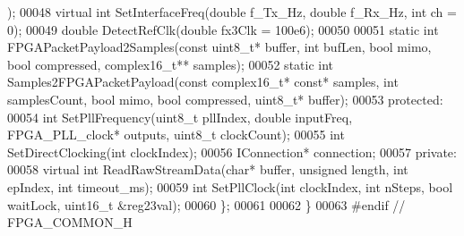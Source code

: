 \begin{DoxyCode}
      );
00048     \textcolor{keyword}{virtual} \textcolor{keywordtype}{int} SetInterfaceFreq(\textcolor{keywordtype}{double} f\_Tx\_Hz, \textcolor{keywordtype}{double} f\_Rx\_Hz, \textcolor{keywordtype}{int} ch = 0);
00049     \textcolor{keywordtype}{double} DetectRefClk(\textcolor{keywordtype}{double} fx3Clk = 100e6);
00050 
00051     \textcolor{keyword}{static} \textcolor{keywordtype}{int} FPGAPacketPayload2Samples(\textcolor{keyword}{const} uint8\_t* buffer, \textcolor{keywordtype}{int} bufLen, \textcolor{keywordtype}{bool} mimo, \textcolor{keywordtype}{bool} compressed, 
      complex16_t** samples);
00052     \textcolor{keyword}{static} \textcolor{keywordtype}{int} Samples2FPGAPacketPayload(\textcolor{keyword}{const} complex16_t* \textcolor{keyword}{const}* samples, \textcolor{keywordtype}{int} samplesCount, \textcolor{keywordtype}{bool} mimo, \textcolor{keywordtype}{
      bool} compressed, uint8\_t* buffer);
00053 \textcolor{keyword}{protected}:
00054     \textcolor{keywordtype}{int} SetPllFrequency(uint8\_t pllIndex, \textcolor{keywordtype}{double} inputFreq, FPGA_PLL_clock* outputs, uint8\_t clockCount);
00055     \textcolor{keywordtype}{int} SetDirectClocking(\textcolor{keywordtype}{int} clockIndex);
00056     IConnection* connection;
00057 \textcolor{keyword}{private}:
00058     \textcolor{keyword}{virtual} \textcolor{keywordtype}{int} ReadRawStreamData(\textcolor{keywordtype}{char}* buffer, \textcolor{keywordtype}{unsigned} length, \textcolor{keywordtype}{int} epIndex, \textcolor{keywordtype}{int} 
      timeout_ms);
00059     \textcolor{keywordtype}{int} SetPllClock(\textcolor{keywordtype}{int} clockIndex, \textcolor{keywordtype}{int} nSteps, \textcolor{keywordtype}{bool} waitLock, uint16\_t &reg23val);
00060 \};
00061 
00062 \}
00063 \textcolor{preprocessor}{#endif // FPGA\_COMMON\_H}
\end{DoxyCode}
